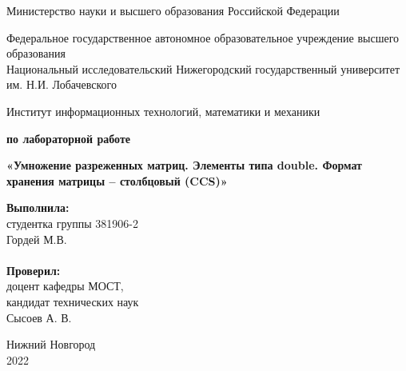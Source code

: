 \documentclass{report}
\begin{document}
\begin{titlepage}

\begin{center}
Министерство науки и высшего образования Российской Федерации
\end{center}

\begin{center}
Федеральное государственное автономное образовательное учреждение высшего образования \\
Национальный исследовательский Нижегородский государственный университет им. Н.И. Лобачевского
\end{center}

\begin{center}
Институт информационных технологий, математики и механики
\end{center}

\vspace{4em}

\begin{center}
\textbf{ по лабораторной работе} \\
\end{center}
\begin{center}
\textbf{\Large«Умножение разреженных матриц. Элементы типа double. Формат хранения матрицы – столбцовый (CCS)»} \\
\end{center}

\vspace{4em}

\newbox{\lbox}
\newlength{\maxl}
\setlength{\maxl}{\wd\lbox}
\hfill\parbox{7cm}{
\hspace*{5cm}\hspace*{-5cm}\textbf{Выполнила:} \\ студентка группы 381906-2 \\ Гордей М.В. \\
\\
\hspace*{5cm}\hspace*{-5cm}\textbf{Проверил:}\\ доцент кафедры МОСТ, \\ кандидат технических наук \\ Сысоев А. В.\\
}
\vspace{\fill}

\begin{center} Нижний Новгород \\ 2022 \end{center}

\end{titlepage}
\end{document}
